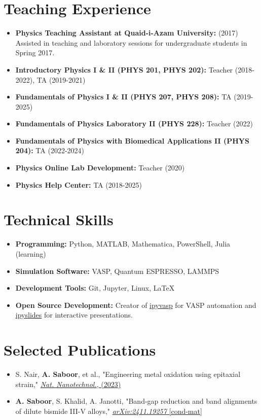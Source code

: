 \documentclass[letter,11pt]{article}
\begin{document}
\section{Teaching Experience}
\begin{itemize}
    \item \textbf{Physics Teaching Assistant at Quaid-i-Azam University:} (2017) \\ 
    Assisted in teaching and laboratory sessions for undergraduate students in Spring 2017.
    \item \textbf{Introductory Physics I \& II (PHYS 201, PHYS 202):} Teacher (2018-2022), TA (2019-2021)
    \item \textbf{Fundamentals of Physics I \& II (PHYS 207, PHYS 208):} TA (2019-2025)
    \item \textbf{Fundamentals of Physics Laboratory II (PHYS 228):} Teacher (2022)
    \item \textbf{Fundamentals of Physics with Biomedical Applications II (PHYS 204):} TA (2022-2024)
    \item \textbf{Physics Online Lab Development:} Teacher (2020)
    \item \textbf{Physics Help Center:} TA (2018-2025)
\end{itemize}

\section{Technical Skills}
\begin{itemize}
    \item \textbf{Programming:} Python, MATLAB, Mathematica, PowerShell, Julia (learning)
    \item \textbf{Simulation Software:} VASP, Quantum ESPRESSO, LAMMPS
    \item \textbf{Development Tools:} Git, Jupyter, Linux, \LaTeX
    \item \textbf{Open Source Development:} Creator of \href{https://github.com/asaboor-gh/ipyvasp}{ipyvasp} for VASP automation and \href{https://github.com/asaboor-gh/ipyslides}{ipyslides} for interactive presentations.
\end{itemize}

\section{Selected Publications}
\begin{itemize}
    \item S. Nair, \textbf{A. Saboor}, et al., "Engineering metal oxidation using epitaxial strain," \href{https://www.nature.com/articles/s41565-023-01397-0}{\textit{Nat. Nanotechnol.}, (2023)}
    \item \textbf{A. Saboor}, S. Khalid, A. Janotti, "Band-gap reduction and band alignments of dilute bismide III-V alloys," \href{https://arxiv.org/abs/2411.19257}{\textit{arXiv:2411.19257} [cond-mat]}
\end{itemize}
\end{document}
